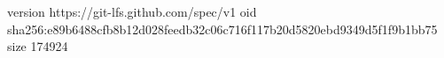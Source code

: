 version https://git-lfs.github.com/spec/v1
oid sha256:e89b6488cfb8b12d028feedb32c06c716f117b20d5820ebd9349d5f1f9b1bb75
size 174924
